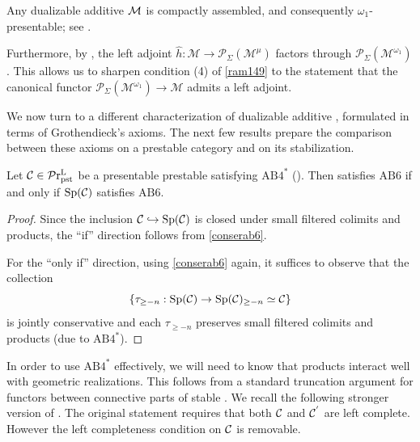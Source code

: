 \documentclass[a4paper,10pt, oneside]{amsart}
\begin{document}
	\begin{rem}\label{rmkcptassemb}
		Any dualizable additive \infcat $\mathcal{M}$ is compactly assembled, and consequently $\omega_1$-presentable; see \cite[Corollary 2.33]{ramzi2024dualizable}. 
		
		Furthermore, by \cite[Remark 1.51]{ramzi2024dualizable}, the left adjoint $\hat{h} \colon \mathcal{M} \rightarrow \mathcal{P}_\Sigma(\mathcal{M}^\mu)$ factors through $\mathcal{P}_\Sigma(\mathcal{M}^{\omega_1})$. This allows us to sharpen condition (4) of \cref{ram149} to the statement that the canonical functor $\mathcal{P}_\Sigma(\mathcal{M}^{\omega_1}) \rightarrow \mathcal{M}$ admits a left adjoint.
	\end{rem}
	
	
	We now turn to a different characterization of dualizable additive \infcats, formulated in terms of Grothendieck's axioms.  The next few results prepare the comparison between these axioms on a prestable category and on its stabilization.
	
	\begin{prop}\label{ab6eq}
		Let $\mathcal{C} \in \mathcal{P}\mathrm{r}^\mathrm{L}_{\mathrm{pst}}$ be a presentable  prestable \infcat satisfying $\mathrm{AB4}^*$  (). Then \mcc satisfies $\mathrm{AB6}$ if and only if $\mathrm{Sp}(\mathcal{C})$ satisfies $\mathrm{AB6}$.
	\end{prop}
	\begin{proof}
		Since the inclusion $\mathcal{C}\hookrightarrow \mathrm{Sp}(\mathcal{C})$ is closed under small filtered colimits and products, the ``if'' direction follows from \cref{conserab6}.
		
		For the ``only if'' direction, using \cref{conserab6} again, it suffices to observe that the collection $$\{\tau_{\geq -n}:\mathrm{Sp}(\mathcal{C})\to \mathrm{Sp}(\mathcal{C})_{\geq -n}\simeq \mathcal{C}\}$$ is jointly conservative and each $\tau_{\geq -n}$ preserves small filtered colimits and products (due to $\mathrm{AB4}^*$).
	\end{proof}
	
	In order to use $\mathrm{AB4}^*$ effectively, we will need to know that products interact well with geometric realizations. This follows from a standard truncation argument for functors between connective parts of stable \infcats. We recall the following stronger version of \cite[Lemma 1.3.3.11]{ha}. The original statement requires that both $\mathcal{C}$ and $\mathcal{C}^{'}$ are left complete. However the left completeness condition on $\mathcal{C}$ is removable.
	
\end{document}

